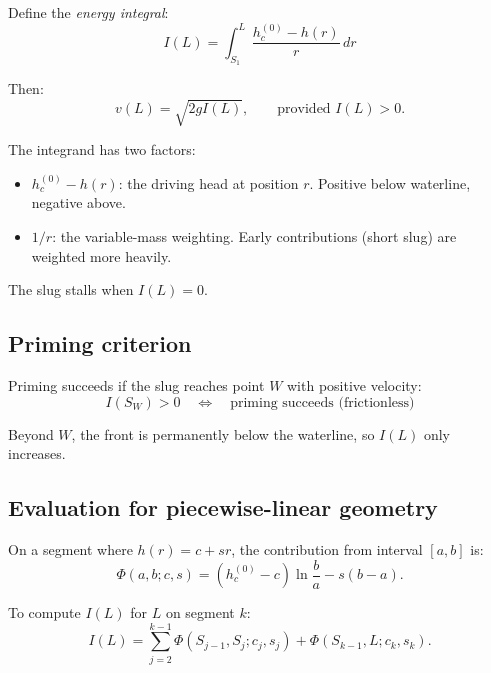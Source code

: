 \documentclass[11pt]{article}
\begin{document}
Define the \emph{energy integral}:
\begin{equation}
  \boxed{I(L) = \int_{S_1}^{L} \frac{h_c^{(0)} - h(r)}{r} \, dr}
  \label{eq:energy-integral}
\end{equation}

Then:
\begin{equation}
  v(L) = \sqrt{2 g I(L)}, \qquad \text{provided } I(L) > 0.
  \label{eq:v-from-I}
\end{equation}

The integrand has two factors:
\begin{itemize}[nosep,leftmargin=2em]
  \item $h_c^{(0)} - h(r)$: the driving head at position $r$. Positive below waterline, negative above.
  \item $1/r$: the variable-mass weighting. Early contributions (short slug) are weighted more heavily.
\end{itemize}

The slug stalls when $I(L) = 0$.

\subsection{Priming criterion}

Priming succeeds if the slug reaches point $W$ with positive velocity:
\begin{equation}
  \boxed{I(S_W) > 0 \quad \Longleftrightarrow \quad \text{priming succeeds (frictionless)}}
  \label{eq:priming-criterion}
\end{equation}

Beyond $W$, the front is permanently below the waterline, so $I(L)$ only increases.

\subsection{Evaluation for piecewise-linear geometry}

On a segment where $h(r) = c + sr$, the contribution from interval $[a, b]$ is:
\begin{equation}
  \Phi(a, b; c, s) = (h_c^{(0)} - c) \ln\frac{b}{a} - s(b - a).
  \label{eq:Phi-def}
\end{equation}

To compute $I(L)$ for $L$ on segment $k$:
\begin{equation}
  I(L) = \sum_{j=2}^{k-1} \Phi(S_{j-1}, S_j; c_j, s_j) + \Phi(S_{k-1}, L; c_k, s_k).
  \label{eq:I-piecewise}
\end{equation}
\end{document}
